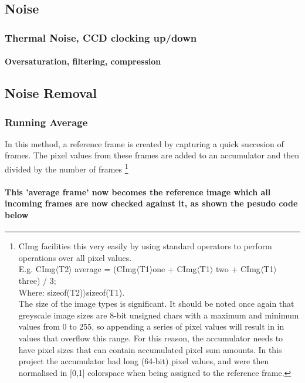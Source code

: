 \documentclass[11pt]{article} %
\begin{document}
\subsection{Noise}
\subsubsection{Thermal Noise, CCD clocking up/down}
\paragraph{Oversaturation, filtering, compression}

\subsection {Noise Removal}
\subsubsection{Running Average}
In this method, a reference frame is created by capturing a quick succesion of frames. The pixel values from these frames are added to an accumulator and then divided by the number of frames  
\footnote{CImg facilities this very easily by using standard operators to perform operations over all pixel values.
\\ E.g.  CImg\(\langle\)T2\(\rangle\) average =  (CImg\(\langle\)T1\(\rangle\)one + CImg\(\langle\)T1\(\rangle\) two + CImg\(\langle\)T1\(\rangle\) three) / 3; \\
Where: sizeof(T2)\(\rangle\)sizeof(T1).
\\The size of the image types is significant. It should be noted once again that greyscale image sizes are 8-bit unsigned chars with a maximum and minimum values from 0 to 255, so appending a series of pixel values will result in in values that overflow this range. For this reason, the accumulator needs to have pixel sizes that can contain accumulated pixel sum amounts. In this project the accumulator had long (64-bit) pixel values, and were then normalised in [0,1] colorspace when being assigned to the reference frame.}
 
\paragraph{
 This 'average frame' now becomes the reference image which all incoming frames are now checked against it, as shown the pesudo code below}
\begin{frame}[fragile]
	
\end{frame}
\end{document}
